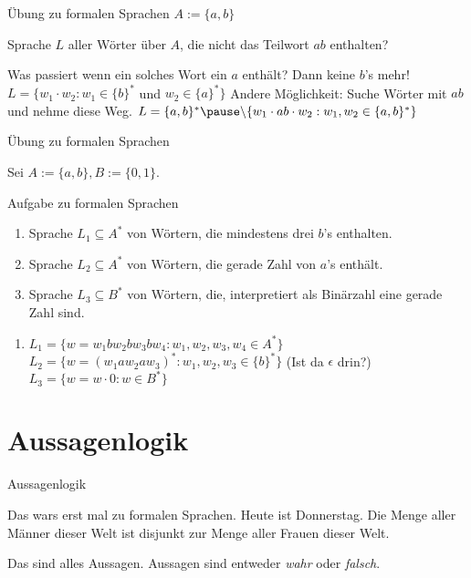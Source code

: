 \documentclass[handout]{beamer}
\begin{document}
\begin{frame}{Übung zu formalen Sprachen}
	$A := \{a, b\}$
	
	\begin{itemize}
		\pitem Sprache $L$ aller Wörter über $A$, die nicht das Teilwort $ab$ enthalten?
		\begin{itemize}
			\pitem Was passiert wenn ein solches Wort ein $a$ enthält? \pause Dann keine $b$'s mehr!
			\pitem $L = \{w_1 \cdot w_2 : w_1 \in \{b\}^*$ und $w_2 \in \{a\}^* \}$
			\pitem Andere Möglichkeit\pause : Suche Wörter mit $ab$ und nehme diese Weg.
			\pitem $L = \{a, b\}^*\pause \backslash\{ w_1 \cdot ab \cdot w_2 : w_1, w_2 \in \{a,b\}^* \}$
		\end{itemize}
	\end{itemize}
\end{frame}

\begin{frame}{Übung zu formalen Sprachen}
	
	Sei $A := \{a, b\}, B := \{0, 1\}$.
	
	\begin{taskblock}{Aufgabe zu formalen Sprachen}
		\begin{enumerate}
			\item Sprache $L_1 \subseteq A^*$ von Wörtern, die mindestens drei $b$'s enthalten.
			\item Sprache $L_2 \subseteq A^*$ von Wörtern, die gerade Zahl von $a$'s enthält.
			\item Sprache $L_3 \subseteq B^*$ von Wörtern, die, interpretiert als Binärzahl eine gerade Zahl sind.
		\end{enumerate}
	\end{taskblock}

	\pause
	
	\begin{enumerate}
		\item $L_1 = \{w = w_1  b  w_2  b  w_3 b w_4 : w_1,w_2,w_3,w_4 \in A^* \}$
		\pitem $L_2 = \{w = (w_1 a w_2 a w_3)^* : w_1,w_2,w_3 \in \{b\}^* \}$ \pause (Ist da $\epsilon$ drin?)
		\pitem $L_3 = \{w = w \cdot 0 : w \in B^* \}$
	\end{enumerate}
\end{frame}

\section{Aussagenlogik}

\begin{frame}{Aussagenlogik}
	\begin{itemize}
		\pitem Das wars erst mal zu formalen Sprachen.
		\pitem Heute ist Donnerstag.
		\pitem Die Menge aller Männer dieser Welt ist disjunkt zur Menge aller Frauen dieser Welt.
	\end{itemize}

	\pause
	
	Das sind alles Aussagen. Aussagen sind entweder \emph{wahr} oder \emph{falsch}.
\end{frame}
\end{document}
